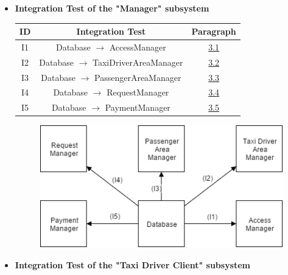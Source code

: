 \documentclass[18pt,oneside,a4paper, titlepage]{article}
\begin{document}
			\begin{itemize}
				
				
				\item \textbf{Integration Test of the "Manager" subsystem }
					\vspace{0.5cm}
					\begin{center}
						\centering
						\begin{tabular}{c c c}
							\hline \textbf{ID} & \textbf{Integration Test} & \textbf{Paragraph} \\
							\hline		I1 &  Database $\rightarrow$ AccessManager & \hyperlink{chapter 3.1}{3.1}\\
							\hline		I2 & Database $\rightarrow$ TaxiDriverAreaManager & \hyperlink{chapter 3.2}{3.2} \\
							\hline		I3 & Database $\rightarrow$ PassengerAreaManager & \hyperlink{chapter 3.3}{3.3}\\
							\hline		I4 & Database $\rightarrow$ RequestManager & \hyperlink{chapter 3.4}{3.4} \\
							\hline		I5 & Database $\rightarrow$ PaymentManager & \hyperlink{chapter 3.5}{3.5} \\
							\hline
						\end{tabular}
					\end{center}
					
					
					\begin{figure}[h]
						\centering
						\includegraphics[scale=0.5]{ManagerSubsystem.png}
					\end{figure}
					
					\vspace{1cm}
					
				\item \textbf{Integration Test of the "Taxi Driver Client" subsystem }
					

\end{itemize}
\end{document}
